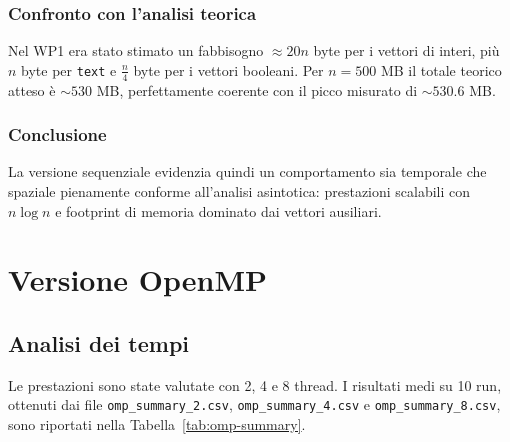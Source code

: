 			\subsubsection*{Confronto con l’analisi teorica}
				Nel WP1 era stato stimato un fabbisogno \(\approx 20n\) byte per i vettori di interi, più \(n\) byte per \texttt{text} e \(\frac{n}{4}\) byte per i vettori booleani.
				Per \(n=500\) MB il totale teorico atteso è \(\sim 530\) MB, perfettamente coerente con il picco misurato di \(\sim 530.6\) MB.
			
			\subsubsection*{Conclusione}
				La versione sequenziale evidenzia quindi un comportamento sia temporale che spaziale pienamente conforme all’analisi asintotica:
				prestazioni scalabili con \(n \log n\) e footprint di memoria dominato dai vettori ausiliari.
	
	\section{Versione OpenMP}
		
		\subsection{Analisi dei tempi}
			Le prestazioni sono state valutate con 2, 4 e 8 thread.
			I risultati medi su 10 run, ottenuti dai file \texttt{omp\_summary\_2.csv}, \texttt{omp\_summary\_4.csv} e \texttt{omp\_summary\_8.csv}, sono riportati nella Tabella~\ref{tab:omp-summary}.
			
